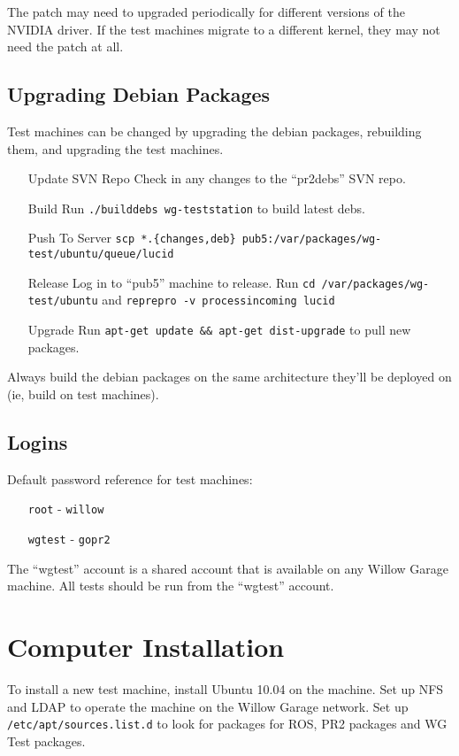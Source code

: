 \documentclass[11pt]{report}
\begin{document}
The patch may need to upgraded periodically for different versions of the NVIDIA driver. If the test machines migrate to a different kernel, they may not need the patch at all.

\subsection{Upgrading Debian Packages}

Test machines can be changed by upgrading the debian packages, rebuilding them, and upgrading the test machines.

\begin{itemize}
\item [Update SVN Repo] Check in any changes to the ``pr2debs'' SVN repo.
\item [Build] Run \texttt{./builddebs wg-teststation} to build latest debs.
\item [Push To Server] \texttt{scp *.\{changes,deb\} pub5:/var/packages/wg-test/ubuntu/queue/lucid}
\item [Release] Log in to ``pub5'' machine to release. Run \texttt{cd /var/packages/wg-test/ubuntu} and \texttt{reprepro -v processincoming lucid}
\item [Upgrade] Run \texttt{apt-get update \&\& apt-get dist-upgrade} to pull new packages.
\end{itemize}

Always build the debian packages on the same architecture they'll be deployed on (ie, build on test machines).

\subsection{Logins}

Default password reference for test machines:
\begin{itemize}
\item [\texttt{root}] - \texttt{willow}
\item [\texttt{wgtest}] - \texttt{gopr2}
\end{itemize}
The ``wgtest'' account is a shared account that is available on any Willow Garage machine. All tests should be run from the ``wgtest'' account.

\section{Computer Installation}

To install a new test machine, install Ubuntu 10.04 on the machine. Set up NFS and LDAP to operate the machine on the Willow Garage network. Set up \texttt{/etc/apt/sources.list.d} to look for packages for ROS, PR2 packages and WG Test packages.
\end{document}
